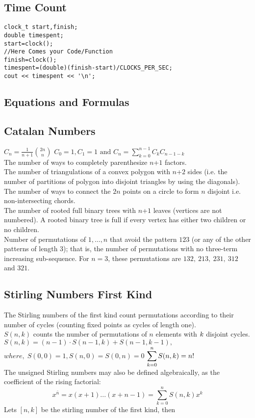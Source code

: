 \documentclass[10pt,a4paper,onesided]{article}
\begin{document}
\begin{multicols*}{3}
\subsection{Time Count}
\begin{lstlisting}
clock_t start,finish;
double timespent;
start=clock();
//Here Comes your Code/Function
finish=clock();
timespent=(double)(finish-start)/CLOCKS_PER_SEC;
cout << timespent << '\n';
\end{lstlisting}
\end{multicols*}
\begin{multicols*}{2}
\newpage
\section{Equations and Formulas}
\subsection{Catalan Numbers}
$\displaystyle C_n=\frac{1}{n+1}{2n \choose n}$
$\displaystyle C_0=1,C_1=1\text{ and }C_n=\sum \limits_{k=0}^{n-1}C_k C_{n-1-k}$ \\
The number of ways to completely parenthesize $n$+$\displaystyle 1$ factors. \\
The number of triangulations of a convex polygon with $n$+$\displaystyle 2$ sides (i.e. the number of partitions of polygon into disjoint triangles by using the diagonals). \\
The number of ways to connect the $\displaystyle 2n$ points on a circle to form $n$ disjoint i.e. non-intersecting chords. \\
The number of rooted full binary trees with $n$+$\displaystyle 1$ leaves (vertices are not numbered). A rooted binary tree is full if every vertex has either two children or no children. \\
Number of permutations of $\displaystyle {1, …, n}$ that avoid the pattern $\displaystyle 123$ (or any of the other patterns of length $3$); that is, the number of permutations with no three-term increasing sub-sequence. For $n = 3$, these permutations are $\displaystyle 132,\ 213,\ 231,\ 312$ and $321.$

\subsection{Stirling Numbers First Kind}
The Stirling numbers of the first kind count permutations according to their number of cycles (counting fixed points as cycles of length one). \\
$S(n,k)$ counts the number of permutations of $n$ elements with $\displaystyle \displaystyle k$ disjoint cycles. \\
$S(n,k)=(n-1) \cdot S(n-1,k)+S(n-1,k-1),$ \(where,\; S(0,0)=1,S(n,0)=S(0,n)=0\)
$\displaystyle \displaystyle\sum_{k=0}^{n}S(n,k) = n!$ \\
The unsigned Stirling numbers may also be defined algebraically, as the coefficient of the rising factorial:
\[\displaystyle x^{\bar{n}} = x(x+1)...(x+n-1) = \sum_{k=0}^{n}{ S(n, k) x^k}\]
Lets $[n, k]$ be the stirling number of the first kind, then


\end{multicols*}
\end{document}

